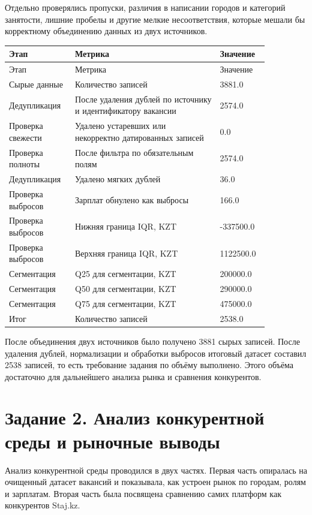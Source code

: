 \documentclass[12pt,a4paper]{article}
\begin{document}
Отдельно проверялись пропуски, различия в написании городов и категорий занятости, лишние пробелы и другие мелкие несоответствия, которые мешали бы корректному объединению данных из двух источников.

\begin{longtable}{p{0.20\linewidth}p{0.50\linewidth}p{0.16\linewidth}}
\toprule
Этап & Метрика & Значение\\
\midrule
\endfirsthead
\toprule
Этап & Метрика & Значение\\
\midrule
\endhead
Сырые данные & Количество записей & 3881.0\\
Дедупликация & После удаления дублей по источнику и идентификатору вакансии & 2574.0\\
Проверка свежести & Удалено устаревших или некорректно датированных записей & 0.0\\
Проверка полноты & После фильтра по обязательным полям & 2574.0\\
Дедупликация & Удалено мягких дублей & 36.0\\
Проверка выбросов & Зарплат обнулено как выбросы & 166.0\\
Проверка выбросов & Нижняя граница IQR, KZT & -337500.0\\
Проверка выбросов & Верхняя граница IQR, KZT & 1122500.0\\
Сегментация & Q25 для сегментации, KZT & 200000.0\\
Сегментация & Q50 для сегментации, KZT & 290000.0\\
Сегментация & Q75 для сегментации, KZT & 475000.0\\
Итог & Количество записей & 2538.0\\
\bottomrule
\end{longtable}

После объединения двух источников было получено 3881 сырых записей. После удаления дублей, нормализации и обработки выбросов итоговый датасет составил 2538 записей, то есть требование задания по объёму выполнено. Этого объёма достаточно для дальнейшего анализа рынка и сравнения конкурентов.

\section{Задание 2. Анализ конкурентной среды и рыночные выводы}

Анализ конкурентной среды проводился в двух частях. Первая часть опиралась на очищенный датасет вакансий и показывала, как устроен рынок по городам, ролям и зарплатам. Вторая часть была посвящена сравнению самих платформ как конкурентов Staj.kz.
\end{document}
